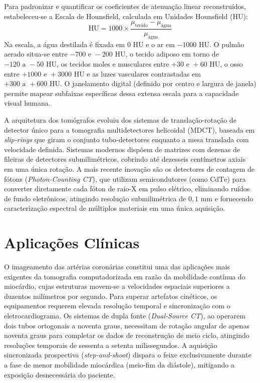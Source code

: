 \documentclass[a4paper,12pt,oneside,openright]{abntex2}
\begin{document}
Para padronizar e quantificar os coeficientes de atenuação linear reconstruídos, estabeleceu-se a Escala de Hounsfield, calculada em Unidades Hounsfield ($\text{HU}$):
\begin{equation}
\text{HU} = 1000 \times \frac{\mu_{\text{tecido}} - \mu_{\text{água}}}{\mu_{\text{água}}}
\end{equation}
Na escala, a água destilada é fixada em $0\text{ HU}$ e o ar em $-1000\text{ HU}$. O pulmão aerado situa-se entre $-700\text{ e }-200\text{ HU}$, o tecido adiposo em torno de $-120\text{ a }-50\text{ HU}$, os tecidos moles e musculares entre $+30\text{ e }+60\text{ HU}$, o osso entre $+1000\text{ e }+3000\text{ HU}$ e as luzes vasculares contrastadas em $+300\text{ a }+600\text{ HU}$. O janelamento digital (definido por centro e largura de janela) permite mapear subfaixas específicas dessa extensa escala para a capacidade visual humana.

A arquitetura dos tomógrafos evoluiu dos sistemas de translação-rotação de detector único para a tomografia multidetectores helicoidal ($\text{MDCT}$), baseada em \textit{slip-rings} que giram o conjunto tubo-detectores enquanto a mesa translada com velocidade definida. Sistemas modernos dispõem de matrizes com dezenas de fileiras de detectores submilimétricos, cobrindo até dezesseis centímetros axiais em uma única rotação. A mais recente inovação são os detectores de contagem de fótons (\textit{Photon-Counting CT}), que utilizam semicondutores (como $\text{CdTe}$) para converter diretamente cada fóton de raio-X em pulso elétrico, eliminando ruídos de fundo eletrônicos, atingindo resolução submilimétrica de $0{,}1\text{ mm}$ e fornecendo caracterização espectral de múltiplos materiais em uma única aquisição.

\section{Aplicações Clínicas}

O imageamento das artérias coronárias constitui uma das aplicações mais exigentes da tomografia computadorizada em razão da mobilidade contínua do miocárdio, cujas estruturas movem-se a velocidades espaciais superiores a duzentos milímetros por segundo. Para superar artefatos cinéticos, os equipamentos requerem elevada resolução temporal e sincronização com o eletrocardiograma. Os sistemas de dupla fonte (\textit{Dual-Source CT}), ao operarem dois tubos ortogonais a noventa graus, necessitam de rotação angular de apenas noventa graus para completar os dados de reconstrução de meio ciclo, atingindo resoluções temporais de sessenta a setenta milissegundos. A aquisição sincronizada prospectiva (\textit{step-and-shoot}) dispara o feixe exclusivamente durante a fase de menor mobilidade miocárdica (meio-fim da diástole), mitigando a exposição desnecessária do paciente.
\end{document}
